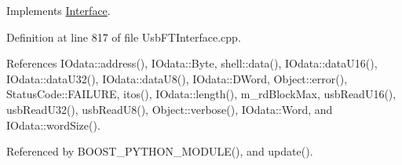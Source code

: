 Implements \hyperlink{classInterface_a99136b67c8e6cbcaa0477c36940ac2ef}{Interface}.



Definition at line 817 of file Usb\+F\+T\+Interface.\+cpp.



References I\+Odata\+::address(), I\+Odata\+::\+Byte, shell\+::data(), I\+Odata\+::data\+U16(), I\+Odata\+::data\+U32(), I\+Odata\+::data\+U8(), I\+Odata\+::\+D\+Word, Object\+::error(), Status\+Code\+::\+F\+A\+I\+L\+U\+RE, itos(), I\+Odata\+::length(), m\+\_\+rd\+Block\+Max, usb\+Read\+U16(), usb\+Read\+U32(), usb\+Read\+U8(), Object\+::verbose(), I\+Odata\+::\+Word, and I\+Odata\+::word\+Size().



Referenced by B\+O\+O\+S\+T\+\_\+\+P\+Y\+T\+H\+O\+N\+\_\+\+M\+O\+D\+U\+L\+E(), and update().


